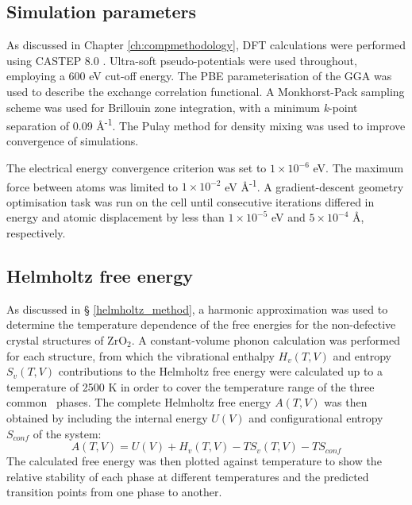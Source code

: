 \subsection{Simulation parameters} \label{simulation_parameters}

As discussed in Chapter \ref{ch:compmethodology}, DFT calculations were performed using CASTEP 8.0 \cite{Clark2005}. Ultra-soft pseudo-potentials were used throughout, employing a 600 eV cut-off energy. The PBE \cite{Perdew1996} parameterisation of the GGA was used to describe the exchange correlation functional. A Monkhorst-Pack sampling scheme \cite{Monkhorst1976} was used for Brillouin zone integration, with a minimum \emph{k}-point separation of 0.09 \r{A}\textsuperscript{-1}. The Pulay method for density mixing \cite{Pulay1980} was used to improve convergence of simulations. 

The electrical energy convergence criterion was set to $1\times10^{-6} $ eV. The maximum force between atoms was limited to $1\times10^{-2}$ eV \r{A}\textsuperscript{-1}. A gradient-descent geometry optimisation task was run on the cell until consecutive iterations differed in energy and atomic displacement by less than $1\times10^{-5}$ eV and $5\times10^{-4}$ \r{A}, respectively. 

\subsection{Helmholtz free energy}

As discussed in § \ref{helmholtz_method}, a harmonic approximation was used to determine the temperature dependence of the free energies for the non-defective crystal structures of ZrO$_{2}$. A constant-volume phonon calculation was performed for each structure, from which the vibrational enthalpy $H_{v}(T, V)$ and entropy $S_{v}(T, V)$ contributions to the Helmholtz free energy were calculated up to a temperature of 2500 K in order to cover the temperature range of the three common \zirconia\ phases. The complete Helmholtz free energy $A(T, V)$ was then obtained by including the internal energy $U(V)$ and configurational entropy $S_{conf}$ of the system:
\begin{equation} \label{helmholtz_equation}
A(T, V) = U(V) + H_{v}(T, V) - TS_{v}(T, V) - TS_{conf}
\end{equation}
The calculated free energy was then plotted against temperature to show the relative stability of each phase at different temperatures and the predicted transition points from one phase to another. 

